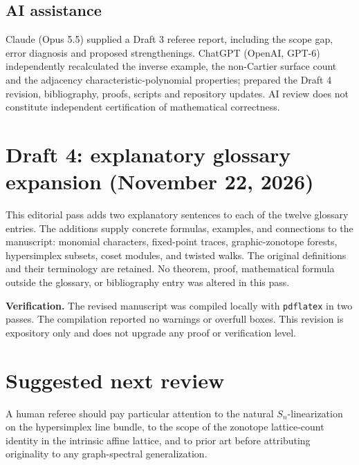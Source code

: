 \documentclass[12pt,letterpaper]{article}
\begin{document}
\subsection*{AI assistance}
Claude (Opus 5.5) supplied a Draft 3 referee report, including the
scope gap, error diagnosis and proposed strengthenings.
ChatGPT (OpenAI, GPT-6) independently recalculated the inverse example,
the non-Cartier surface count and the adjacency characteristic-polynomial
properties; prepared the Draft 4 revision, bibliography, proofs,
scripts and repository updates. AI review does not constitute independent
certification of mathematical correctness.

\section{Draft 4: explanatory glossary expansion (November 22, 2026)}
This editorial pass adds two explanatory sentences to each of the twelve
glossary entries. The additions supply concrete formulas, examples, and
connections to the manuscript: monomial characters, fixed-point traces,
graphic-zonotope forests, hypersimplex subsets, coset modules, and
twisted walks. The original definitions and their terminology are retained.
No theorem, proof, mathematical formula outside the glossary, or bibliography
entry was altered in this pass.

\noindent\textbf{Verification.} The revised manuscript was compiled locally
with \texttt{pdflatex} in two passes. The compilation reported no warnings
or overfull boxes. This revision is expository only and does not upgrade
any proof or verification level.

\section{Suggested next review}
A human referee should pay particular attention to the natural $S_n$-linearization on the hypersimplex line bundle, to the scope of the zonotope lattice-count identity in the intrinsic affine lattice, and to prior art before attributing originality to any graph-spectral generalization.
\end{document}
